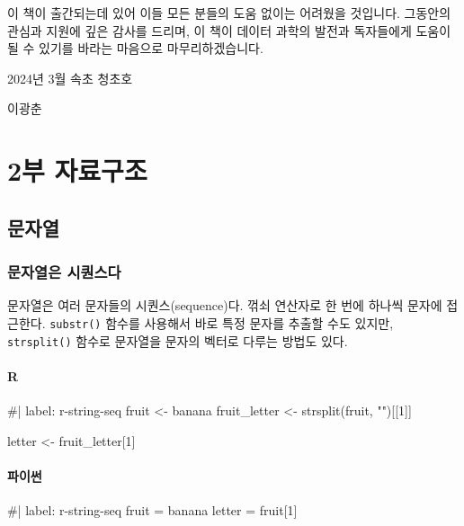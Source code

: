 \documentclass[
  letterpaper,
]{book}
\newenvironment{Shaded}{\begin{snugshade}}{\end{snugshade}}
\newcommand{\NormalTok}[1]{\textcolor[rgb]{0.00,0.23,0.31}{#1}}
\begin{document}
이 책이 출간되는데 있어 이들 모든 분들의 도움 없이는 어려웠을 것입니다.
그동안의 관심과 지원에 깊은 감사를 드리며, 이 책이 데이터 과학의 발전과
독자들에게 도움이 될 수 있기를 바라는 마음으로 마무리하겠습니다.

\begin{flushright}
2024년 3월 속초 청초호

이광춘

\end{flushright}

\part{\textbf{2부} 자료구조}

\chapter{문자열}\label{r-string}

\section{문자열은 시퀀스다}\label{r-string-sequence}

   

문자열은 여러 문자들의 시퀀스(sequence)다. 꺾쇠 연산자로 한 번에 하나씩
문자에 접근한다. \texttt{substr()} 함수를 사용해서 바로 특정 문자를
추출할 수도 있지만, \texttt{strsplit()} 함수로 문자열을 문자의 벡터로
다루는 방법도 있다.

\subsection{R}

\begin{Shaded}
\begin{Highlighting}[]
\NormalTok{\#| label: r{-}string{-}seq}
\NormalTok{fruit \textless{}{-} \textquotesingle{}banana\textquotesingle{}}
\NormalTok{fruit\_letter \textless{}{-} strsplit(fruit, "")[[1]]}

\NormalTok{letter \textless{}{-} fruit\_letter[1]}
\end{Highlighting}
\end{Shaded}

\subsection{파이썬}

\begin{Shaded}
\begin{Highlighting}[]
\NormalTok{\#| label: r{-}string{-}seq}
\NormalTok{fruit = \textquotesingle{}banana\textquotesingle{}}
\NormalTok{letter = fruit[1]}
\end{Highlighting}
\end{Shaded}
\end{document}
